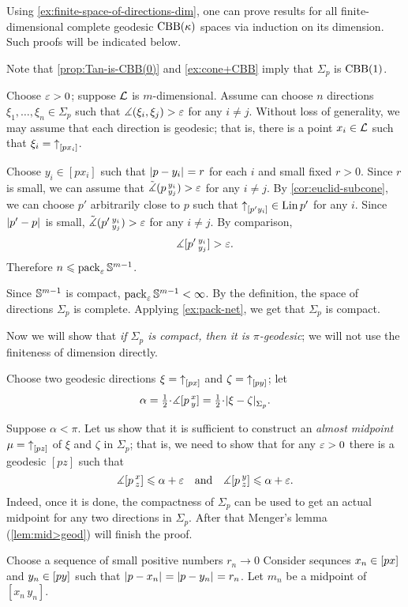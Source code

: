 Using \ref{ex:finite-space-of-directions-dim}, one can prove results for all finite-dimensional complete geodesic $\mathrm{CBB}(\kappa)$ spaces via induction on its dimension.
Such proofs will be indicated below.

Note that \ref{prop:Tan-is-CBB(0)} and \ref{ex:cone+CBB} imply that $\Sigma_p$ is $\mathrm{CBB}(1)$.

Choose $\varepsilon>0$; suppose $\mathcal{L}$ is $m$-dimensional.
Assume can choose $n$ directions $\xi_1,\dots, \xi_n\in \Sigma_p$ such that $\mangle(\xi_i,\xi_j)\z>\eps$ for any $i\ne j$.
Without loss of generality, we may assume that each direction is geodesic;
that is, there is a point $x_i\in \mathcal{L}$ such that $\xi_i={\uparrow}_{[{p}{x_i}]}$.

Choose $y_i\in [px_i]$ such that $\dist{p}{y_i}{}=r$ for each $i$ and small fixed $r>0$.
Since $r$ is small, we can assume that $\tilde\measuredangle(p\,{}^{y_i}_{y_j})>\varepsilon$ for any $i\ne j$.
By \ref{cor:euclid-subcone}, we can choose $p'$ arbitrarily close to $p$ such that ${\uparrow}_{[{p'}{y_i}]}\in \mathop{\rm Lin}\nolimits{p'}$ for any $i$.
Since  $\dist{p'}{p}{}$ is small, $\tilde\measuredangle(p'\,{}^{y_i}_{y_j})>\varepsilon$ for any $i\ne j$.
By comparison, 
\[\measuredangle [p'\,{}^{y_i}_{y_j}]>\varepsilon.\]
Therefore $n\leqslant \operatorname{\rm pack}\nolimits_\varepsilon\mathbb{S}^{m-1}$.

Since $\mathbb{S}^{m-1}$ is compact, $\operatorname{\rm pack}\nolimits_\varepsilon\mathbb{S}^{m-1}<\infty$.
By the definition, the space of directions $\Sigma_p$ is complete. 
Applying \ref{ex:pack-net}, we get that  $\Sigma_p$ is compact.

Now we will show that \textit{if $\Sigma_p$ is compact, then it is $\pi$-geodesic};
we will not use the finiteness of dimension directly.

Choose two geodesic directions $\xi={\uparrow}_{[{p}{x}]}$ and $\zeta={\uparrow}_{[{p}{y}]}$;
let 
\[\alpha\z=\tfrac12\cdot \mangle \hinge pxy=\tfrac12\cdot \dist{\xi}{\zeta}{\Sigma_p}.\]

Suppose $\alpha<\pi$.
Let us show that it is sufficient to construct an \emph{almost midpoint} $\mu\z=\dir pz$ of $\xi$ and $\zeta$ in $\Sigma_p$;
that is, we need to show that for any $\varepsilon>0$ there is a geodesic $[pz]$ such that
\[\measuredangle[p\,{}^{x}_{z}]\leqslant \alpha+\varepsilon
\quad\text{and}\quad
\measuredangle[p\,{}^{y}_{z}]\leqslant \alpha+\varepsilon.\]
Indeed, once it is done, the compactness of $\Sigma_p$ can be used to get an actual midpoint for any two directions in $\Sigma_p$.
After that Menger's lemma (\ref{lem:mid>geod}) will finish the proof.

Choose a sequence of small positive numbers $r_n\to0$
Consider sequnces $x_n\z\in [px]$ and $y_n\z\in [py]$ such that $\dist{p}{x_n}{}=\dist{p}{y_n}{}=r_n$.
Let $m_n$ be a midpoint of $[x_n\,y_n]$.

